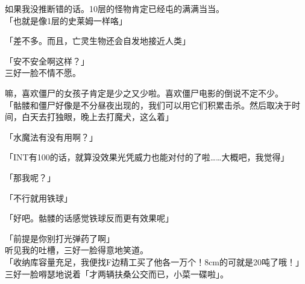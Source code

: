 如果我没推断错的话。10层的怪物肯定已经屯的满满当当。\\

「也就是像1层的史莱姆一样咯」

「差不多。而且，亡灵生物还会自发地接近人类」

「安不安全啊这样？」\\

三好一脸不情不愿。

嘛，喜欢僵尸的女孩子肯定是少之又少啦。喜欢僵尸电影的倒说不定不少。\\

「骷髅和僵尸好像是不分昼夜出现的，我们可以用它们积累击杀。然后取决于时间，白天去打独眼，晚上去打魔犬，这么着」

「水魔法有没有用啊？」

「INT有100的话，就算没效果光凭威力也能对付的了啦……大概吧，我觉得」

「那我呢？」

「不行就用铁球」

「好吧。骷髅的话感觉铁球反而更有效果呢」

「前提是你别打光弹药了啊」\\

听见我的吐槽，三好一脸得意地笑道。\\

「收纳库容量充足，我便找F边精工买了他各一万个！8cm的可就是20吨了哦！」\\

三好一脸嘚瑟地说着「才两辆扶桑公交而已，小菜一碟啦」。

